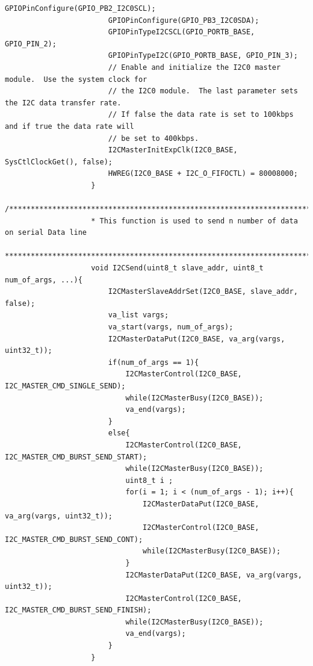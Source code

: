 \documentclass[a4paper,10pt,oneside]{article}
\begin{document}
\begin{lstlisting}[style=CStyle]
						GPIOPinConfigure(GPIO_PB2_I2C0SCL);
						GPIOPinConfigure(GPIO_PB3_I2C0SDA);
						GPIOPinTypeI2CSCL(GPIO_PORTB_BASE, GPIO_PIN_2);
						GPIOPinTypeI2C(GPIO_PORTB_BASE, GPIO_PIN_3);
						// Enable and initialize the I2C0 master module.  Use the system clock for
						// the I2C0 module.  The last parameter sets the I2C data transfer rate.
						// If false the data rate is set to 100kbps and if true the data rate will
						// be set to 400kbps.
						I2CMasterInitExpClk(I2C0_BASE, SysCtlClockGet(), false);
						HWREG(I2C0_BASE + I2C_O_FIFOCTL) = 80008000;
					}
					/***********************************************************************
					* This function is used to send n number of data on serial Data line
					***********************************************************************/
					void I2CSend(uint8_t slave_addr, uint8_t num_of_args, ...){
						I2CMasterSlaveAddrSet(I2C0_BASE, slave_addr, false);
						va_list vargs;
						va_start(vargs, num_of_args);
						I2CMasterDataPut(I2C0_BASE, va_arg(vargs, uint32_t));
						if(num_of_args == 1){
							I2CMasterControl(I2C0_BASE, I2C_MASTER_CMD_SINGLE_SEND);
							while(I2CMasterBusy(I2C0_BASE));
							va_end(vargs);
						}
						else{
							I2CMasterControl(I2C0_BASE, I2C_MASTER_CMD_BURST_SEND_START);
							while(I2CMasterBusy(I2C0_BASE));
							uint8_t i ;
							for(i = 1; i < (num_of_args - 1); i++){
								I2CMasterDataPut(I2C0_BASE, va_arg(vargs, uint32_t));
								I2CMasterControl(I2C0_BASE, I2C_MASTER_CMD_BURST_SEND_CONT);
								while(I2CMasterBusy(I2C0_BASE));
							}
							I2CMasterDataPut(I2C0_BASE, va_arg(vargs, uint32_t));
							I2CMasterControl(I2C0_BASE, I2C_MASTER_CMD_BURST_SEND_FINISH);
							while(I2CMasterBusy(I2C0_BASE));
							va_end(vargs);
						}
					}
					

\end{lstlisting}
\end{document}
